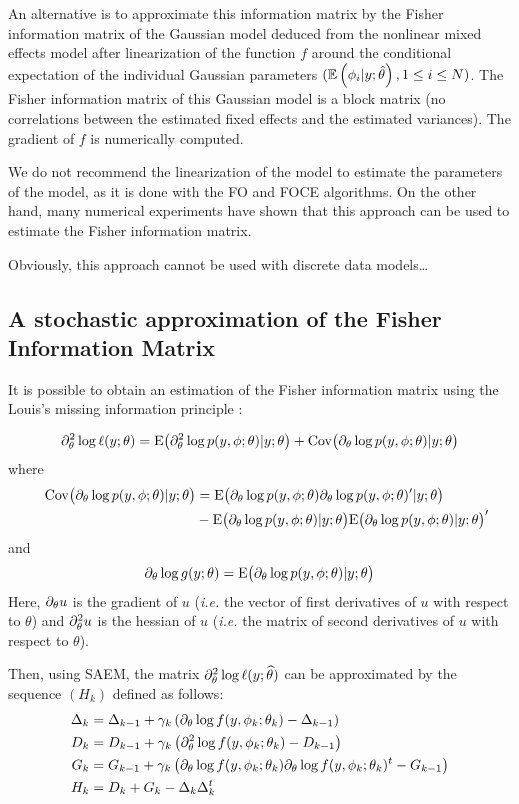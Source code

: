 An alternative is  to approximate this information matrix  by the Fisher information matrix of the Gaussian model deduced from the nonlinear mixed effects model after linearization of the function $f$ around the conditional expectation of the individual Gaussian parameters $(\mathbb{E}\left(\phi_{i}|y;\hat{\theta}\right), 1\leq
i \leq N) $. The Fisher information matrix of this Gaussian model is a block matrix (no correlations between the estimated fixed effects and the estimated variances). The gradient of $f$ is numerically computed.

 We do not recommend the linearization of the model to estimate the parameters of the model, as it is done with the FO and FOCE algorithms. On the other hand, many numerical experiments have shown that this approach can be used to estimate the Fisher information matrix.

 Obviously, this approach cannot be used with discrete data models\ldots

\subsection{A stochastic approximation of the Fisher Information Matrix}
It is possible to obtain an estimation of the Fisher information matrix using the Louis's missing information principle \cite{Louis82}:

\begin{equation}\label{louis}
\partial^2_\theta \log \ell(y;\theta) = \mathrm{E}\big(\partial^2_\theta \log p(y,{\phi}; \theta) | y ; \theta \big) +
\mathrm{Cov}\big(\partial_\theta \log p(y,{\phi};\theta)| y ; \theta \big)
\end{equation}
where
\begin{align*} \quad
\mathrm{Cov}\big(\partial_\theta \log p(y,{\phi};\theta)| y ; \theta \big) &=
\mathrm{E} \big(\partial_\theta \log p(y,{\phi}; \theta) \partial_\theta \log p(y,{\phi}; \theta)^\prime |y ; \theta \big)  \\
& -
\mathrm{E} \big( \partial_\theta \log p(y,{\phi}; \theta) |y ; \theta \big)\mathrm{E} \big( \partial_\theta \log p(y,{\phi}; \theta) |y ; \theta \big)^\prime
\end{align*}
and
$$\partial_\theta \log g(y;\theta) = \mathrm{E} \big( \partial_\theta \log p(y,{\phi}; \theta) |y ; \theta \big)$$
Here, $\partial_\theta u$ is the gradient of $u$ ({\it i.e.} the vector of first derivatives of $u$ with respect to $\theta$) and  $\partial^2_\theta u$ is the hessian of $u$ ({\it i.e.} the matrix of second derivatives of $u$ with respect to $\theta$).

Then, using SAEM, the matrix $\partial^2_\theta \log \ell (y;{\widehat{\theta}})$ can be approximated by the sequence $(H_k)$ defined as follows:
\begin{align*}
\Delta_k&=\Delta_{k-1}+\gamma_k\left(\partial_{\theta}\log
f(y,\phi_k;\theta_k)-\Delta_{k-1}\right)\\
D_k  &=   D_{k-1}   +   \gamma_k  \left( \partial^2_\theta \log  f (y,  \phi_k;
    \theta_k)   - D_{k-1} \right) \\
G_k  &=   G_{k-1}   +   \gamma_k  \left(  \partial_\theta \log f(y, \phi_k; \theta_k) \partial_\theta \log f(y, \phi_k; \theta_k)^t - G_{k-1} \right) \\
H_{k} &= D_k + G_k - \Delta_k \Delta_k^t
\end{align*}

